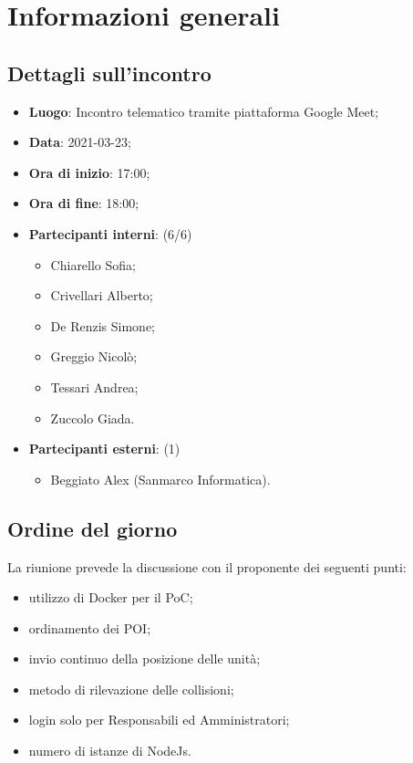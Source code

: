 \section{Informazioni generali}

\subsection{Dettagli sull'incontro}
\begin{itemize}
\item \textbf{Luogo}: Incontro telematico tramite piattaforma Google Meet;
\item \textbf{Data}: 2021-03-23;
\item \textbf{Ora di inizio}: 17:00;
\item \textbf{Ora di fine}: 18:00;
\item \textbf{Partecipanti interni}: (6/6)
\begin{itemize}
	\item Chiarello Sofia;
	\item Crivellari Alberto;
	\item De Renzis Simone;
	\item Greggio Nicolò;
	\item Tessari Andrea;
	\item Zuccolo Giada.
\end{itemize}
\item \textbf{Partecipanti esterni}: (1)
\begin{itemize}
	\item Beggiato Alex (Sanmarco Informatica).
\end{itemize}
\end{itemize}

\subsection{Ordine del giorno}

La riunione prevede la discussione con il proponente dei seguenti punti:
\begin{itemize}
	\item utilizzo di Docker per il PoC;
	\item ordinamento dei POI;
	\item invio continuo della posizione delle unità;
	\item metodo di rilevazione delle collisioni;
	\item login solo per Responsabili ed Amministratori;
	\item numero di istanze di NodeJs.
\end{itemize}




